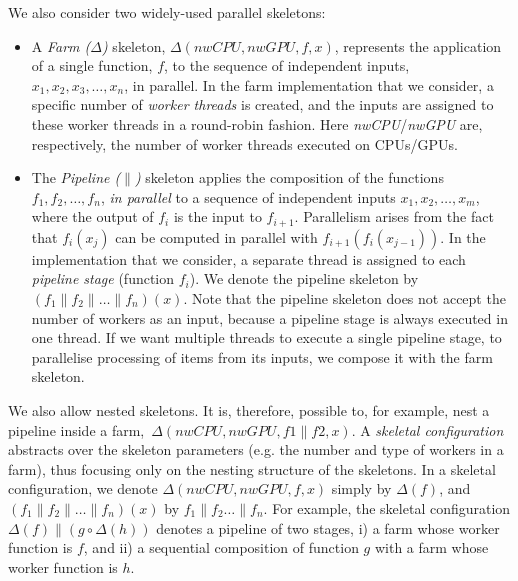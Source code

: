 \documentclass[smallextended]{svjour3}
\begin{document}
We also consider two widely-used parallel skeletons:
\begin{itemize}
\item A \emph{Farm ($\Delta$)} skeleton,  $\Delta(\mathit{nwCPU},\mathit{nwGPU},f,x)$, represents the application of a single function,
  $f$, to the sequence of independent inputs,\\ 
  $x_1,x_2,x_3,\dots,x_n$, in parallel. In the farm implementation
  that we consider, a specific number of
  \emph{worker threads} is created, and the inputs are assigned to
  these worker threads in a round-robin fashion.  
 Here \emph{nwCPU}/\emph{nwGPU} are, respectively, the number of worker
 threads executed on CPUs/GPUs.
\item The \emph{Pipeline ($\parallel$)} skeleton applies
    the composition
    of the functions \\ $f_1, f_2, \dots, f_n$, \emph{in parallel} to a sequence of independent inputs
   $x_1,x_2,\dots,x_m$, where the output of $f_i$ is the input to
   $f_{i+1}$. Parallelism arises from the fact that
   $f_i(x_j)$ can be computed in parallel with
   $f_{i+1}(f_i(x_{j-1}))$. In the implementation that we
   consider, a separate thread is assigned to each
   \emph{pipeline stage} (function $f_i$).
   We denote the pipeline skeleton by
    $(f_1 \parallel f_2 \parallel \dots \parallel f_n)(x) $. Note that
    the pipeline skeleton does not accept the number of workers as an
    input, because a pipeline stage is always executed in one
    thread. If we want multiple threads to execute a single pipeline
    stage, to parallelise processing of items from its inputs, we
    compose it with the farm skeleton.
\end{itemize}

\noindent
We also allow nested skeletons. It is, therefore, possible to, for example, nest a
pipeline inside a farm,\ $\Delta(nwCPU,nwGPU,f1 \parallel f2, x)$.
A \emph{skeletal configuration}  abstracts over the skeleton
parameters (e.g. the number and type of
workers in a farm), thus focusing only on the nesting structure of the
skeletons. In a skeletal configuration, we denote
$\Delta(\mathit{nwCPU},\mathit{nwGPU},f,x)$ simply by $\Delta(f)$, and $(f_1 \parallel
f_2 \parallel \dots \parallel f_n)(x)$ by $f_1 \parallel f_2
\dots \parallel f_n$. For example, the skeletal
configuration $\Delta(f) \parallel (g \circ \Delta(h))$
denotes a
pipeline of two stages, %
i) a farm whose worker function is $f$, and ii) a sequential composition of
function $g$ with a farm whose worker function is $h$. %
%
\end{document}
